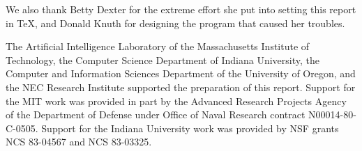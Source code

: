 \vest We also thank Betty Dexter for the extreme effort she put into
setting this report in \TeX, and Donald Knuth for designing the program
that caused her troubles.

\vest The Artificial Intelligence Laboratory of the
Massachusetts Institute of Technology, the Computer Science
Department of Indiana University, the Computer and Information
Sciences Department of the University of Oregon, and the NEC Research
Institute supported the preparation of this report.  Support for the MIT
work was provided in part by
the Advanced Research Projects Agency of the Department of Defense under Office
of Naval Research contract N00014-80-C-0505.  Support for the Indiana
University work was provided by NSF grants NCS 83-04567 and NCS
83-03325.


